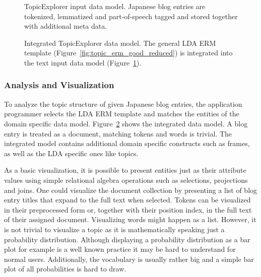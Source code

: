 \begin{figure}
\centering
\scalebox{\tikzScale}{\adjustTikzSize }
\caption[TopicExplorer input data model]{TopicExplorer input data model. Japanese blog entries are tokenized, lemmatized and part-of-speech tagged and stored together with additional meta data.}\label{fig:TopicExplorer_data_erm}
\end{figure}

\begin{figure}
\centering
\scalebox{0.7}{\adjustTikzSize }
\caption[Integrated TopicExplorer data model]{Integrated TopicExplorer data model. The general LDA ERM template (Figure~\ref{fig:topic_erm_good_reduced}) is integrated into the text input data model (Figure~\ref{fig:TopicExplorer_data_erm}).}\label{fig:TopicExplorer_integrated_erm}
\end{figure}

\subsubsection{Analysis and Visualization}
\label{subsec:casestudy_analysis}

To analyze the topic structure of given Japanese blog entries, the application programmer selects the LDA ERM template and matches the entities of the domain specific data model. Figure~\ref{fig:TopicExplorer_integrated_erm} shows the integrated data model. A blog entry is treated as a document, matching tokens and words is trivial. The integrated model contains additional domain specific constructs such as frames, as well as the LDA specific ones like topics.

As a basic visualization, it is possible to present entities just as their attribute values using simple relational algebra operations such as selections, projections and joins. One could visualize the document collection by presenting a list of blog entry titles that expand to the full text when selected. Tokens can be visualized in their preprocessed form or, together with their position index, in the full text of their assigned document. Visualizing words might happen as a list. However, it is not trivial to visualize a topic as it is mathematically speaking just a probability distribution. Although displaying a probability distribution as a bar plot for example is a well known practice it may be hard to understand for normal users. Additionally, the vocabulary is usually rather big and a simple bar plot of all probabilities is hard to draw.

